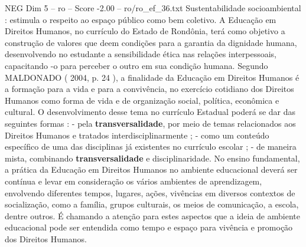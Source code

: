 \begin{textsample}{NEG Dim 5 – ro – Score -2.00 – ro/ro\_ef\_36.txt}
Sustentabilidade socioambiental : estimula o respeito ao espaço público como bem coletivo.
A Educação em Direitos Humanos, no currículo do Estado de Rondônia, terá como objetivo a construção de valores que deem condições para a garantia da dignidade humana, desenvolvendo no estudante a sensibilidade ética nas relações interpessoais, capacitando -o para perceber o outro em sua condição humana.
Segundo MALDONADO ( 2004, p. 24 ), a finalidade da Educação em Direitos Humanos é a formação para a vida e para a convivência, no exercício cotidiano dos Direitos Humanos como forma de vida e de organização social, política, econômica e cultural.
O desenvolvimento desse tema no currículo Estadual poderá se dar das seguintes formas : - pela \textbf{transversalidade}, por meio de temas relacionados aos Direitos Humanos e tratados interdisciplinarmente ; - como um conteúdo específico de uma das disciplinas já existentes no currículo escolar ; - de maneira mista, combinando \textbf{transversalidade} e disciplinaridade.
No ensino fundamental, a prática da Educação em Direitos Humanos no ambiente educacional deverá ser contínua e levar em consideração os vários ambientes de aprendizagem, envolvendo diferentes tempos, lugares, ações, vivências em diversos contextos de socialização, como a família, grupos culturais, os meios de comunicação, a escola, dentre outros.
É chamando a atenção para estes aspectos que a ideia de ambiente educacional pode ser entendida como tempo e espaço para vivência e promoção dos Direitos Humanos.

\end{textsample}
